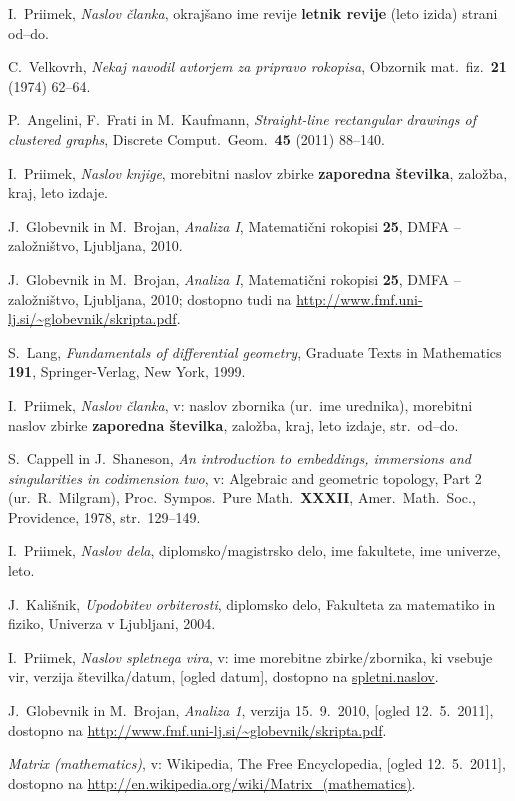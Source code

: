 \documentclass[mat1]{fmfdelo}
\begin{document}
\begin{thebibliography}{99}

I.~Priimek, \emph{Naslov članka}, okrajšano ime revije \textbf{letnik revije} (leto izida) strani od--do.

C.~Velkovrh, \emph{Nekaj navodil avtorjem za pripravo rokopisa}, Obzornik mat.\ fiz.\ \textbf{21} (1974) 62--64.

P.~Angelini, F.~Frati in M.~Kaufmann, \emph{Straight-line rectangular drawings of clustered graphs}, Discrete Comput.\ Geom.\ \textbf{45} (2011) 88--140.


I.~Priimek, \emph{Naslov knjige}, morebitni naslov zbirke  \textbf{zaporedna številka}, založba, kraj, leto izdaje.

J.~Globevnik in M.~Brojan, \emph{Analiza I}, Matematični rokopisi \textbf{25}, DMFA -- založništvo, Ljubljana, 2010.

J.~Globevnik in M.~Brojan, \emph{Analiza I}, Matematični rokopisi \textbf{25}, DMFA -- založništvo, Ljubljana, 2010; dostopno tudi na
\url{http://www.fmf.uni-lj.si/~globevnik/skripta.pdf}.

S.~Lang, \emph{Fundamentals of differential geometry}, Graduate Texts in Mathematics \textbf{191}, Springer-Verlag, New York, 1999.

I.~Priimek, \emph{Naslov članka}, v: naslov zbornika (ur.\ ime urednika), morebitni naslov zbirke  \textbf{zaporedna številka}, založba, kraj, leto izdaje, str.\ od--do.

S.~Cappell in J.~Shaneson, \emph{An introduction to embeddings, immersions and singularities in codimension two}, v: Algebraic and geometric topology, Part 2 (ur.\ R.~Milgram), Proc.\ Sympos.\ Pure Math.\ \textbf{XXXII}, Amer.\ Math.\ Soc., Providence, 1978, str.\ 129--149.

I.~Priimek, \emph{Naslov dela}, diplomsko/magistrsko delo, ime fakultete, ime univerze, leto.

J.~Kališnik, \emph{Upodobitev orbiterosti}, diplomsko delo, Fakulteta za matematiko in fiziko, Univerza v Ljubljani, 2004.

I.~Priimek, \emph{Naslov spletnega vira}, v: ime morebitne zbirke/zbornika, ki vsebuje vir, verzija številka/datum, [ogled datum], dostopno na \url{spletni.naslov}.

J.~Globevnik in M.~Brojan, \emph{Analiza 1}, verzija 15.~9.~2010, [ogled 12.~5.~2011], dostopno na \url{http://www.fmf.uni-lj.si/~globevnik/skripta.pdf}.

\emph{Matrix (mathematics)}, v: Wikipedia, The Free Encyclopedia, [ogled 12.~5.~2011], dostopno na \url{http://en.wikipedia.org/wiki/Matrix_(mathematics)}.

\end{thebibliography}
\end{document}
